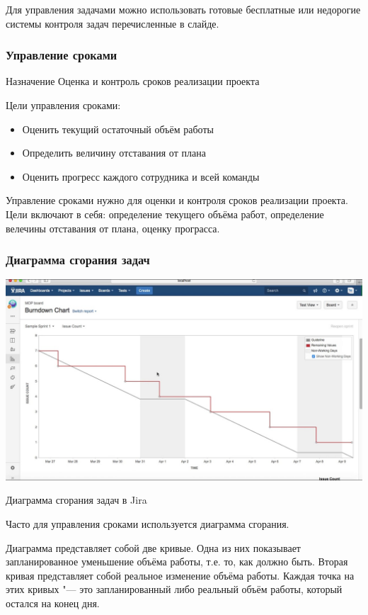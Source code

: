 \documentclass{../industrial-development}
\begin{document}
Для управления задачами можно использовать готовые бесплатные или недорогие системы контроля задач перечисленные в слайде.

\begin{frame} \frametitle{Управление сроками}
	\begin{block}{Назначение}
		Оценка и контроль сроков реализации проекта
	\end{block}
	Цели управления сроками:
	\begin{itemize}
		\item Оценить текущий остаточный объём работы
		\item Определить величину отставания от плана
		\item Оценить прогресс каждого сотрудника и всей команды
	\end{itemize}
\end{frame}
\lecturenotes

Управление сроками нужно для оценки и контроля сроков реализации проекта. Цели включают в себя: определение текущего объёма работ, определение велечины отставания от плана, оценку програсса.

\begin{frame} \frametitle{Диаграмма сгорания задач}
	\centerline{\includegraphics[width=1\textwidth]{burn.jpg}}
	\centerline{Диаграмма сгорания задач в Jira}
\end{frame}
\lecturenotes

Часто для управления сроками используется диаграмма сгорания. 

Диаграмма представляет собой две кривые. Одна из них показывает запланированное уменьшение объёма работы, т.е. то, как должно быть. Вторая кривая представляет собой реальное изменение объёма работы. Каждая точка на этих кривых "--- это запланированный либо реальный объём работы, который остался на конец дня.
\end{document}
